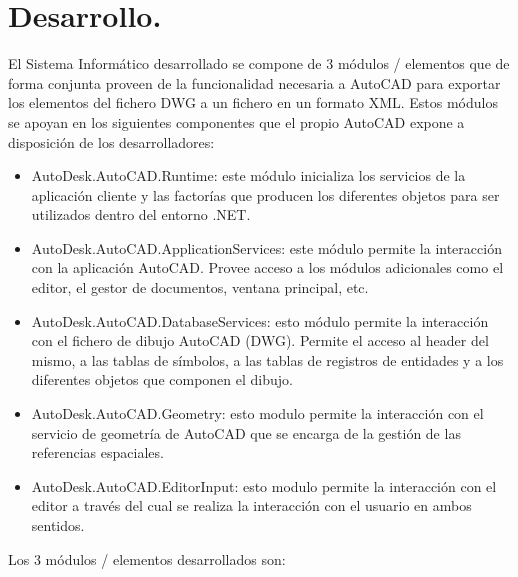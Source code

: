 \section{Desarrollo.}
El Sistema Informático desarrollado se compone de 3 módulos / elementos que de forma conjunta proveen de la funcionalidad necesaria a AutoCAD para exportar los elementos del fichero DWG a un fichero en un formato XML. Estos módulos se apoyan en los siguientes componentes que el propio AutoCAD expone a disposición de los desarrolladores:

\begin{itemize}

\item{AutoDesk.AutoCAD.Runtime: este módulo inicializa los servicios de la aplicación cliente y las factorías que producen los diferentes objetos para ser utilizados dentro del entorno .NET.}

\item{AutoDesk.AutoCAD.ApplicationServices: este módulo permite la interacción con la aplicación AutoCAD. Provee acceso a los módulos adicionales como el editor, el gestor de documentos, ventana principal, etc.}

\item{AutoDesk.AutoCAD.DatabaseServices: esto módulo permite la interacción con el fichero de dibujo AutoCAD (DWG). Permite el acceso al header del mismo, a las tablas de símbolos, a las tablas de registros de entidades y a los diferentes objetos que componen el dibujo.}

\item{AutoDesk.AutoCAD.Geometry: esto modulo permite la interacción con el servicio de geometría de AutoCAD que se encarga de la gestión de las referencias espaciales.}

\item{AutoDesk.AutoCAD.EditorInput: esto modulo permite la interacción con el editor a través del cual se realiza la interacción con el usuario en ambos sentidos.}

\end{itemize}

Los 3 módulos / elementos desarrollados son:

